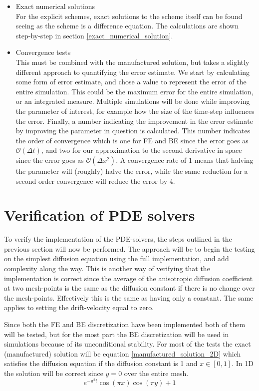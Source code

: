 \begin{itemize}
\item Exact numerical solutions\\
For the explicit schemes, exact solutions to the scheme itself can be found seeing as the scheme is a difference equation. The calculations are shown step-by-step in section \ref{exact_numerical_solution}.
\item Convergence tests\\
This must be combined with the manufactured solution, but takes a slightly different approach to quantifying the error estimate. We start by calculating some form of error estimate, and chose a value to represent the error of the entire simulation. This could be the maximum error for the entire simulation, or an integrated measure. 
Multiple simulations will be done while improving the parameter of interest, for example how the size of the time-step influences the error. 
Finally, a number indicating the improvement in the error estimate by improving the parameter in question is calculated. 
This number indicates the order of convergence which is one for FE and BE since the error goes as $\mathcal{O}(\Delta t)$, and two for our approximation to the second derivative in space since the error goes as $\mathcal O(\Delta x^2)$.
A convergence rate of 1 means that halving the parameter will (roughly) halve the error, while the same reduction for a second order convergence will reduce the error by 4.
\end{itemize}


\section{Verification of PDE solvers}
To verify the implementation of the PDE-solvers, the steps outlined in the previous section will now be performed. 
The approach will be to begin the testing on the simplest diffusion equation using the full implementation, and add complexity along the way. 
This is another way of verifying that the implementation is correct since the average of the anisotropic diffusion coefficient at two mesh-points is the same as the diffusion constant if there is no change over the mesh-points. Effectively this is the same as having only a constant. 
The same applies to setting the drift-velocity equal to zero. 

Since both the FE and BE discretization have been implemented both of them will be tested, but for the most part the BE discretization will be used in simulations because of its unconditional stability.
For most of the tests the exact (manufactured) solution will be equation \eqref{manufactured_solution_2D} which satisfies the diffusion equation if the diffusion constant is 1 and $x\in[0,1]$. 
In 1D the solution will be correct since $y=0$ over the entire mesh. 
\begin{equation}\label{manufactured_solution_2D}
 e^{-\pi^2t}\cos(\pi x)\cos(\pi y) +1
\end{equation}



